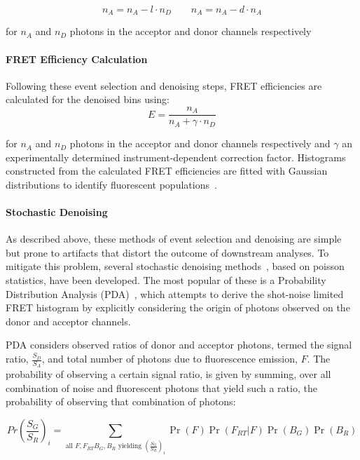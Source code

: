 \begin{equation}
n_A = n_A - l \cdot n_D \qquad n_A = n_A - d \cdot n_A
\label{eq:cross-talk}
\end{equation}

for $n_A$ and $n_D$ photons in the acceptor and donor channels respectively

\paragraph{FRET Efficiency Calculation}
Following these event selection and denoising steps, FRET efficiencies are calculated for the denoised bins using: 
\begin{equation}
E = \frac{n_A}{n_A + \gamma \cdot n_D}
\label{eq:Eprod}
\end{equation} 

for $n_A$ and $n_D$ photons in the acceptor and donor channels respectively and $\gamma$ an experimentally determined instrument-dependent correction factor.  Histograms constructed from the calculated FRET efficiencies are fitted with Gaussian distributions to identify fluorescent populations~\cite{ha96}.

\clearpage

\paragraph{Stochastic Denoising}
As described above, these methods of event selection and denoising are simple but prone to artifacts that distort the outcome of downstream analyses. To mitigate this problem, several stochastic denoising methods~\cite{kalinin2007, antonik2006, santoso10, torella11}, based on poisson statistics, have been developed. The most popular of these is a Probability Distribution Analysis (PDA)~\cite{antonik2006}, which attempts to derive the shot-noise limited FRET histogram by explicitly considering the origin of photons observed on the donor and acceptor channels. 

PDA considers observed ratios of donor and acceptor photons, termed the signal ratio, $\frac{S_D}{S_A}$, and total number of photons due to fluorescence emission, $F$. The probability of observing a certain signal ratio, is given by summing,  over all combination of noise and fluorescent photons that yield such a ratio, the probability of observing that combination of photons:

\begin{equation}
Pr (\frac{S_G}{S_R})_i = \sum \limits_{\text{all $F, F_{RT} B_G, B_R$ yielding $(\frac{S_G}{S_R})_i$}} \Pr(F) \Pr(F_{RT}| F) \Pr(B_G) \Pr(B_R)
\label{eq:PDA1}
\end{equation}

